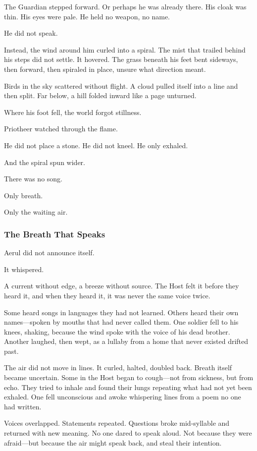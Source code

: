 \documentclass[12pt]{article}
\begin{document}
The Guardian stepped forward. Or perhaps he was already there. His cloak was thin. His eyes were pale. He held no weapon, no name.

He did not speak.

Instead, the wind around him curled into a spiral. The mist that trailed behind his steps did not settle. It hovered. The grass beneath his feet bent sideways, then forward, then spiraled in place, unsure what direction meant.

Birds in the sky scattered without flight. A cloud pulled itself into a line and then split. Far below, a hill folded inward like a page unturned.

Where his foot fell, the world forgot stillness.

Priotheer watched through the flame.

He did not place a stone. He did not kneel. He only exhaled.

And the spiral spun wider.

There was no song.

Only breath.

Only the waiting air.

\dotfill

\subsubsection*{The Breath That Speaks}

Aerul did not announce itself.

It whispered.

A current without edge, a breeze without source. The Host felt it before they heard it, and when they heard it, it was never the same voice twice.

Some heard songs in languages they had not learned. Others heard their own names—spoken by mouths that had never called them. One soldier fell to his knees, shaking, because the wind spoke with the voice of his dead brother. Another laughed, then wept, as a lullaby from a home that never existed drifted past.

The air did not move in lines. It curled, halted, doubled back. Breath itself became uncertain. Some in the Host began to cough—not from sickness, but from echo. They tried to inhale and found their lungs repeating what had not yet been exhaled. One fell unconscious and awoke whispering lines from a poem no one had written.

Voices overlapped. Statements repeated. Questions broke mid-syllable and returned with new meaning. No one dared to speak aloud. Not because they were afraid—but because the air might speak back, and steal their intention.
\end{document}
